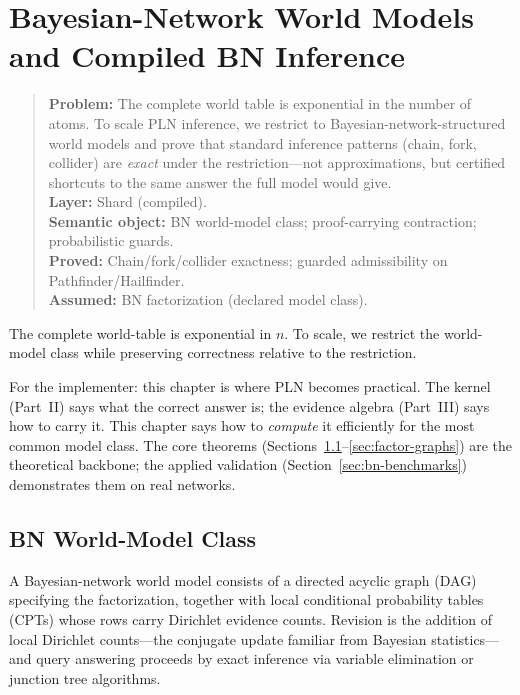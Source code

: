 \documentclass[11pt,openany]{report}
\begin{document}
\chapter{Bayesian-Network World Models and Compiled BN Inference}
\label{ch:bn-models}

\begin{quote}\small
\textbf{Problem:} The complete world table is exponential in the number
of atoms.  To scale PLN inference, we restrict to Bayesian-network-structured
world models and prove that standard inference patterns (chain, fork,
collider) are \emph{exact} under the restriction---not approximations,
but certified shortcuts to the same answer the full model would give.\\[4pt]
\textbf{Layer:} Shard (compiled).\\
\textbf{Semantic object:} BN world-model class; proof-carrying contraction; probabilistic guards.\\
\textbf{Proved:} Chain/fork/collider exactness; guarded admissibility on Pathfinder/Hailfinder.\\
\textbf{Assumed:} BN factorization (declared model class).
\end{quote}

The complete world-table \JointEvidence{} is exponential in $n$.  To scale,
we restrict the world-model class while preserving correctness relative
to the restriction.

For the implementer: this chapter is where PLN becomes practical.  The
kernel (Part~II) says what the correct answer is; the evidence algebra
(Part~III) says how to carry it.  This chapter says how to
\emph{compute} it efficiently for the most common model class.  The core
theorems (Sections~\ref{sec:bn-class}--\ref{sec:factor-graphs}) are the
theoretical backbone; the applied validation
(Section~\ref{sec:bn-benchmarks}) demonstrates them on real networks.

\section{BN World-Model Class}
\label{sec:bn-class}

A Bayesian-network world model consists of a directed acyclic graph (DAG)
specifying the factorization, together with local conditional probability
tables (CPTs) whose rows carry Dirichlet evidence counts.  Revision is
the addition of local Dirichlet counts---the conjugate update familiar
from Bayesian statistics---and query answering proceeds by exact inference
via variable elimination or junction tree algorithms.
\end{document}
